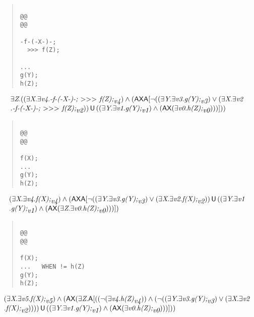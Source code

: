 \documentclass{article}
\newcommand{\U}{\,\mbox{\sf{U}}\,}
\newcommand{\A}{\mbox{\sf{A}}}
\newcommand{\AX}{\mbox{\sf{AX}}}
\newcommand{\mita}[1]{\mbox{\it{{#1}}}}
\newcommand{\mth}[1]{\({#1}\)}
\begin{document}
\begin{quote}\begin{verbatim}

@@
@@

-f-(-X-)-;
  >>> f(Z);

...
g(Y);
h(Z);
\end{verbatim}\end{quote}

\[\begin{array}{l}
\exists \mita{Z} . ((\exists \mita{X} . \exists \mita{v4} . \mita{-f-(-X-)-;
  \mth{>}\mth{>}\mth{>} f(Z);}_{\mita{v4}}) \wedge (\AX\A[\neg ((\exists \mita{Y} . \exists \mita{v3} . \mita{g(Y);}_{\mita{v3}}) \vee (\exists \mita{X} . \exists \mita{v2}\\\mbox{} . \mita{-f-(-X-)-;
  \mth{>}\mth{>}\mth{>} f(Z);}_{\mita{v2}})) \U ((\exists \mita{Y} . \exists \mita{v1} . \mita{g(Y);}_{\mita{v1}}) \wedge (\AX(\exists \mita{v0} . \mita{h(Z);}_{\mita{v0}})))]
))
\end{array}\]

\begin{quote}\begin{verbatim}

@@
@@

f(X);
...
g(Y);
h(Z);
\end{verbatim}\end{quote}

\[\begin{array}{l}
(\exists \mita{X} . \exists \mita{v4} . \mita{f(X);}_{\mita{v4}}) \wedge (\AX\A[\neg ((\exists \mita{Y} . \exists \mita{v3} . \mita{g(Y);}_{\mita{v3}}) \vee (\exists \mita{X} . \exists \mita{v2} . \mita{f(X);}_{\mita{v2}})) \U ((\exists \mita{Y} . \exists \mita{v1}\\\mbox{} . \mita{g(Y);}_{\mita{v1}}) \wedge (\AX(\exists \mita{Z} . \exists \mita{v0} . \mita{h(Z);}_{\mita{v0}})))]
)
\end{array}\]

\begin{quote}\begin{verbatim}

@@
@@

f(X);
...   WHEN != h(Z)
g(Y);
h(Z);
\end{verbatim}\end{quote}

\[\begin{array}{l}
(\exists \mita{X} . \exists \mita{v5} . \mita{f(X);}_{\mita{v5}}) \wedge (\AX(\exists \mita{Z} . \A[((\neg (\exists \mita{v4} . \mita{h(Z)}_{\mita{v4}})) \wedge (\neg ((\exists \mita{Y} . \exists \mita{v3} . \mita{g(Y);}_{\mita{v3}}) \vee (\exists \mita{X} . \exists \mita{v2}\\\mbox{} . \mita{f(X);}_{\mita{v2}})))) \U ((\exists \mita{Y} . \exists \mita{v1} . \mita{g(Y);}_{\mita{v1}}) \wedge (\AX(\exists \mita{v0} . \mita{h(Z);}_{\mita{v0}})))]
))
\end{array}\]
\end{document}
